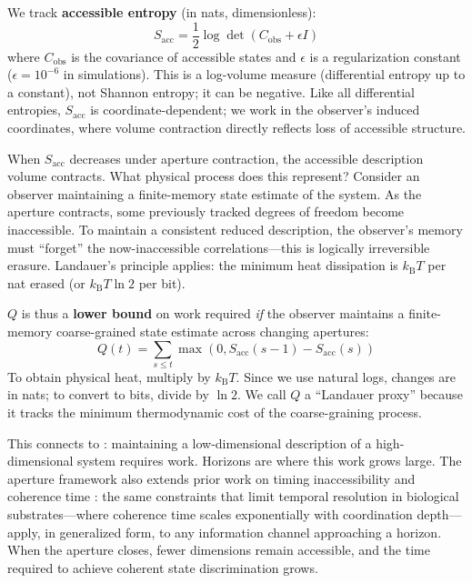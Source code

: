\documentclass[11pt,a4paper]{article}
\begin{document}
We track \textbf{accessible entropy} (in nats, dimensionless):
\begin{equation}
    S_{\mathrm{acc}} = \frac{1}{2}\log\det (C_{\mathrm{obs}} + \epsilon I)
\end{equation}
where $C_{\mathrm{obs}}$ is the covariance of accessible states and $\epsilon$ is a regularization constant ($\epsilon = 10^{-6}$ in simulations). This is a log-volume measure (differential entropy up to a constant), not Shannon entropy; it can be negative. Like all differential entropies, $S_{\mathrm{acc}}$ is coordinate-dependent; we work in the observer's induced coordinates, where volume contraction directly reflects loss of accessible structure.

When $S_{\mathrm{acc}}$ decreases under aperture contraction, the accessible description volume contracts. What physical process does this represent? Consider an observer maintaining a finite-memory state estimate of the system. As the aperture contracts, some previously tracked degrees of freedom become inaccessible. To maintain a consistent reduced description, the observer's memory must ``forget'' the now-inaccessible correlations---this is logically irreversible erasure. Landauer's principle applies: the minimum heat dissipation is $k_{\mathrm{B}}T$ per nat erased (or $k_{\mathrm{B}}T \ln 2$ per bit).

$Q$ is thus a \textbf{lower bound} on work required \emph{if} the observer maintains a finite-memory coarse-grained state estimate across changing apertures:
\begin{equation}
    Q(t) = \sum_{s \leq t} \max(0, S_{\mathrm{acc}}(s-1) - S_{\mathrm{acc}}(s))
\end{equation}
To obtain physical heat, multiply by $k_{\mathrm{B}}T$. Since we use natural logs, changes are in nats; to convert to bits, divide by $\ln 2$. We call $Q$ a ``Landauer proxy'' because it tracks the minimum thermodynamic cost of the coarse-graining process.

This connects to \cite{todd2025infodynamics}: maintaining a low-dimensional description of a high-dimensional system requires work. Horizons are where this work grows large. The aperture framework also extends prior work on timing inaccessibility \cite{todd2025timing} and coherence time \cite{todd2025coherence}: the same constraints that limit temporal resolution in biological substrates---where coherence time scales exponentially with coordination depth---apply, in generalized form, to any information channel approaching a horizon. When the aperture closes, fewer dimensions remain accessible, and the time required to achieve coherent state discrimination grows.
\end{document}

